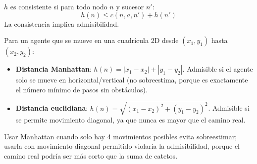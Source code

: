 \begin{definition}
$h$ es consistente si para todo nodo $n$ y sucesor $n'$:
$$h(n) \leq c(n, a, n') + h(n')$$
La consistencia implica admisibilidad.
\end{definition}

\begin{example}
    Para un agente que se mueve en una cuadrícula 2D desde $(x_1,y_1)$ hasta $(x_2,y_2)$:
    \begin{itemize}
        \item \textbf{Distancia Manhattan}: $h(n) = |x_1-x_2| + |y_1-y_2|$. Admisible si el agente solo se mueve en
        horizontal/vertical (no sobreestima, porque es exactamente el número mínimo de pasos sin obstáculos).
        \item \textbf{Distancia euclidiana}: $h(n) = \sqrt{(x_1-x_2)^2 + (y_1-y_2)^2}$. Admisible si se permite
        movimiento diagonal, ya que nunca es mayor que el camino real.
    \end{itemize}
    Usar Manhattan cuando solo hay 4 movimientos posibles evita sobreestimar; usarla con movimiento diagonal
    permitido violaría la admisibilidad, porque el camino real podría ser más corto que la suma de catetos.
\end{example}

